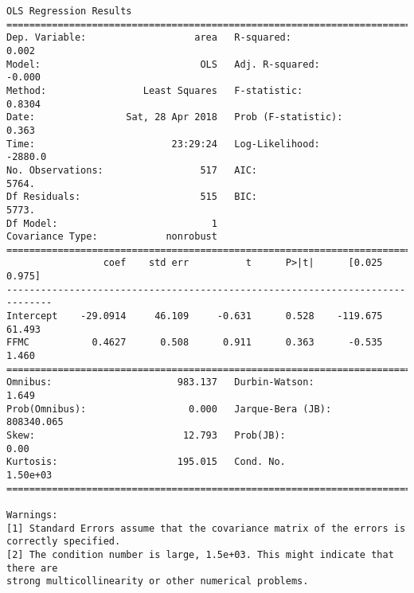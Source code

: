 \documentclass[11pt]{article}
\begin{document}
\begin{Verbatim}[commandchars=\\\{\}]
                            OLS Regression Results                            
==============================================================================
Dep. Variable:                   area   R-squared:                       0.002
Model:                            OLS   Adj. R-squared:                 -0.000
Method:                 Least Squares   F-statistic:                    0.8304
Date:                Sat, 28 Apr 2018   Prob (F-statistic):              0.363
Time:                        23:29:24   Log-Likelihood:                -2880.0
No. Observations:                 517   AIC:                             5764.
Df Residuals:                     515   BIC:                             5773.
Df Model:                           1                                         
Covariance Type:            nonrobust                                         
==============================================================================
                 coef    std err          t      P>|t|      [0.025      0.975]
------------------------------------------------------------------------------
Intercept    -29.0914     46.109     -0.631      0.528    -119.675      61.493
FFMC           0.4627      0.508      0.911      0.363      -0.535       1.460
==============================================================================
Omnibus:                      983.137   Durbin-Watson:                   1.649
Prob(Omnibus):                  0.000   Jarque-Bera (JB):           808340.065
Skew:                          12.793   Prob(JB):                         0.00
Kurtosis:                     195.015   Cond. No.                     1.50e+03
==============================================================================

Warnings:
[1] Standard Errors assume that the covariance matrix of the errors is correctly specified.
[2] The condition number is large, 1.5e+03. This might indicate that there are
strong multicollinearity or other numerical problems.



\end{Verbatim}
\end{document}
